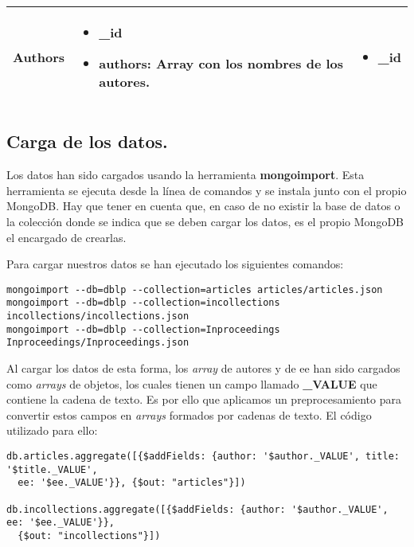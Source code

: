 \begin{center}
\begin{tabular}{ | l | l | l |}
    Authors &
    \begin{minipage}[t]{0.4\textwidth}
      \begin{itemize}
	\item \_id
	\item authors: Array con los nombres de los autores.
      \end{itemize}
    \end{minipage} & 
    \begin{minipage}[t]{0.3\textwidth}
      \begin{itemize}
	\item \_id
      \end{itemize} 
    \end{minipage}  \\ \hline
  \end{tabular}
\end{center}

\subsection{Carga de los datos.}

Los datos han sido cargados usando la herramienta \textbf{mongoimport}. Esta herramienta se ejecuta desde la línea de comandos y se instala junto con el propio MongoDB. Hay que tener en cuenta que, en caso de no existir la base de datos o la colección donde se indica que se deben cargar los datos, es el propio MongoDB el encargado de crearlas.

Para cargar nuestros datos se han ejecutado los siguientes comandos:

\begin{verbatim}
mongoimport --db=dblp --collection=articles articles/articles.json	
mongoimport --db=dblp --collection=incollections incollections/incollections.json	
mongoimport --db=dblp --collection=Inproceedings Inproceedings/Inproceedings.json	
\end{verbatim}

Al cargar los datos de esta forma, los \textit{array} de autores y de ee han sido cargados como \textit{arrays} de objetos, los cuales tienen un campo llamado \textbf{\_VALUE} que contiene la cadena de texto. Es por ello que aplicamos un preprocesamiento para convertir estos campos en \textit{arrays} formados por cadenas de texto. El código utilizado para ello:

\begin{verbatim}
db.articles.aggregate([{$addFields: {author: '$author._VALUE', title: '$title._VALUE',
  ee: '$ee._VALUE'}}, {$out: "articles"}])

db.incollections.aggregate([{$addFields: {author: '$author._VALUE', ee: '$ee._VALUE'}},
  {$out: "incollections"}])
\end{verbatim}

